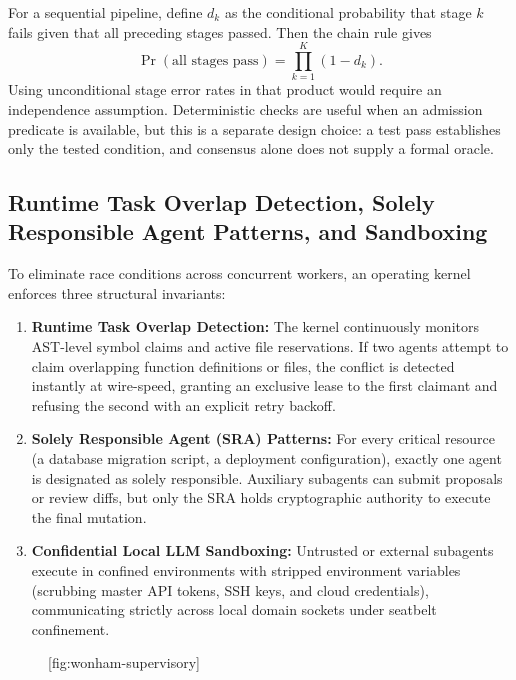 \documentclass[11pt,a4paper]{article}
\begin{document}
For a sequential pipeline, define $d_k$ as the conditional probability that stage $k$ fails given that all preceding stages passed. Then the chain rule gives
\begin{equation}
\Pr(\text{all stages pass})=\prod_{k=1}^{K}(1-d_k).
\end{equation}
Using unconditional stage error rates in that product would require an independence assumption. Deterministic checks are useful when an admission predicate is available, but this is a separate design choice: a test pass establishes only the tested condition, and consensus alone does not supply a formal oracle.

\subsection{Runtime Task Overlap Detection, Solely Responsible Agent Patterns, and Sandboxing}

To eliminate race conditions across concurrent workers, an operating kernel enforces three structural invariants:
\begin{enumerate}[leftmargin=1.8em,itemsep=2pt]
  \item \textbf{Runtime Task Overlap Detection:} The kernel continuously monitors AST-level symbol claims and active file reservations. If two agents attempt to claim overlapping function definitions or files, the conflict is detected instantly at wire-speed, granting an exclusive lease to the first claimant and refusing the second with an explicit retry backoff.
  \item \textbf{Solely Responsible Agent (SRA) Patterns:} For every critical resource (a database migration script, a deployment configuration), exactly one agent is designated as solely responsible. Auxiliary subagents can submit proposals or review diffs, but only the SRA holds cryptographic authority to execute the final mutation.
  \item \textbf{Confidential Local LLM Sandboxing:} Untrusted or external subagents execute in confined environments with stripped environment variables (scrubbing master API tokens, SSH keys, and cloud credentials), communicating strictly across local domain sockets under seatbelt confinement.
\end{enumerate}

\begin{figure}[tp]
  \centering
  [fig:wonham-supervisory]
\end{figure}
\end{document}
